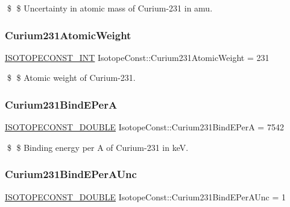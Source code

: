 \$ \$ Uncertainty in atomic mass of Curium-\/231 in amu. \mbox{\label{group___isotope_const-_curium-_cm231_ga405cdf825c84e0dfb4b46977a672d377}} 
\subsubsection{\texorpdfstring{Curium231\+Atomic\+Weight}{Curium231AtomicWeight}}
{\footnotesize\ttfamily \mbox{\hyperlink{group___isotope_const-_macros_ga5f18360b3e99483a35c32d789e62621c}{I\+S\+O\+T\+O\+P\+E\+C\+O\+N\+S\+T\+\_\+\+I\+NT}} Isotope\+Const\+::\+Curium231\+Atomic\+Weight = 231}

\$ \$ Atomic weight of Curium-\/231. \mbox{\label{group___isotope_const-_curium-_cm231_gab3e7624892609d81bd7a1138a635d9e4}} 
\subsubsection{\texorpdfstring{Curium231\+Bind\+E\+PerA}{Curium231BindEPerA}}
{\footnotesize\ttfamily \mbox{\hyperlink{group___isotope_const-_macros_ga8f45a7272ce02c0b4c65c44636ed719a}{I\+S\+O\+T\+O\+P\+E\+C\+O\+N\+S\+T\+\_\+\+D\+O\+U\+B\+LE}} Isotope\+Const\+::\+Curium231\+Bind\+E\+PerA = 7542}

\$ \$ Binding energy per A of Curium-\/231 in keV. \mbox{\label{group___isotope_const-_curium-_cm231_ga2081f829847568334b5b575e9f27d706}} 
\subsubsection{\texorpdfstring{Curium231\+Bind\+E\+Per\+A\+Unc}{Curium231BindEPerAUnc}}
{\footnotesize\ttfamily \mbox{\hyperlink{group___isotope_const-_macros_ga8f45a7272ce02c0b4c65c44636ed719a}{I\+S\+O\+T\+O\+P\+E\+C\+O\+N\+S\+T\+\_\+\+D\+O\+U\+B\+LE}} Isotope\+Const\+::\+Curium231\+Bind\+E\+Per\+A\+Unc = 1}

